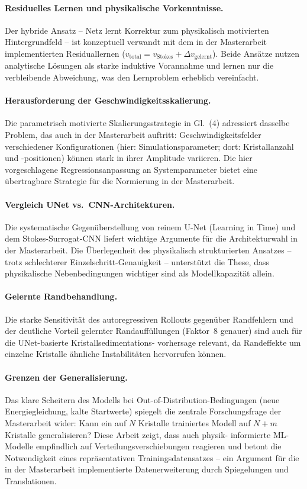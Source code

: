 \documentclass[a4paper,12pt]{article}
\begin{document}
\paragraph{Residuelles Lernen und physikalische Vorkenntnisse.}
Der hybride Ansatz -- Netz lernt Korrektur zum physikalisch motivierten
Hintergrundfeld -- ist konzeptuell verwandt mit dem in der Masterarbeit
implementierten Residuallernen ($v_\text{total} = v_\text{Stokes} + \Delta v_\text{gelernt}$).
Beide Ans\"atze nutzen analytische L\"osungen als starke induktive Vorannahme
und lernen nur die verbleibende Abweichung, was den Lernproblem erheblich
vereinfacht.

\paragraph{Herausforderung der Geschwindigkeitsskalierung.}
Die parametrisch motivierte Skalierungsstrategie in Gl.\ (4) adressiert
dasselbe Problem, das auch in der Masterarbeit auftritt: Geschwindigkeitsfelder
verschiedener Konfigurationen (hier: Simulationsparameter; dort: Kristallanzahl
und -positionen) k\"onnen stark in ihrer Amplitude variieren. Die hier
vorgeschlagene Regressionsanpassung an Systemparameter bietet eine
\"ubertragbare Strategie f\"ur die Normierung in der Masterarbeit.

\paragraph{Vergleich UNet vs.\ CNN-Architekturen.}
Die systematische Gegen\"uberstellung von reinem U-Net (Learning in Time)
und dem Stokes-Surrogat-CNN liefert wichtige Argumente f\"ur die
Architekturwahl in der Masterarbeit. Die \"Uberlegenheit des physikalisch
strukturierten Ansatzes -- trotz schlechterer Einzelschritt-Genauigkeit --
unterst\"utzt die These, dass physikalische Nebenbedingungen wichtiger sind
als Modellkapazit\"at allein.

\paragraph{Gelernte Randbehandlung.}
Die starke Sensitivit\"at des autoregressiven Rollouts gegen\"uber
Randfehlern und der deutliche Vorteil gelernter Randauff\"ullungen
(Faktor~8 genauer) sind auch f\"ur die UNet-basierte Kristallsedimentations-
vorhersage relevant, da Randeffekte um einzelne Kristalle \"ahnliche
Instabilit\"aten hervorrufen k\"onnen.

\paragraph{Grenzen der Generalisierung.}
Das klare Scheitern des Modells bei Out-of-Distribution-Bedingungen (neue
Energiegleichung, kalte Startwerte) spiegelt die zentrale Forschungsfrage der
Masterarbeit wider: Kann ein auf $N$ Kristalle trainiertes Modell auf
$N + m$ Kristalle generalisieren? Diese Arbeit zeigt, dass auch physik-
informierte ML-Modelle empfindlich auf Verteilungsverschiebungen reagieren
und betont die Notwendigkeit eines repr\"asentativen Trainingsdatensatzes --
ein Argument f\"ur die in der Masterarbeit implementierte Datenerweiterung
durch Spiegelungen und Translationen.
\end{document}
